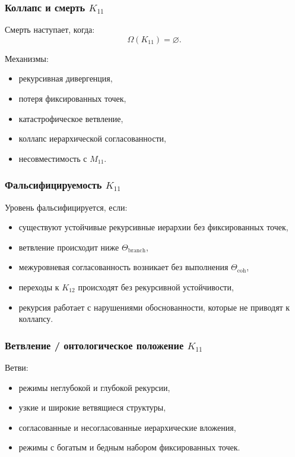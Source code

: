 \subsubsection{Коллапс и смерть $K_{11}$}

Смерть наступает, когда:
\[
\Omega(K_{11})=\varnothing.
\]

Механизмы:
\begin{itemize}
    \item рекурсивная дивергенция,
    \item потеря фиксированных точек,
    \item катастрофическое ветвление,
    \item коллапс иерархической согласованности,
    \item несовместимость с $M_{11}$.
\end{itemize}

\subsubsection{Фальсифицируемость $K_{11}$}

Уровень фальсифицируется, если:
\begin{itemize}
    \item существуют устойчивые рекурсивные иерархии без фиксированных точек,
    \item ветвление происходит ниже $\Theta_{\mathrm{branch}}$,
    \item межуровневая согласованность возникает без выполнения $\Theta_{\mathrm{coh}}$,
    \item переходы к $K_{12}$ происходят без рекурсивной устойчивости,
    \item рекурсия работает с нарушениями обоснованности, которые не приводят к коллапсу.
\end{itemize}

\subsubsection{Ветвление / онтологическое положение $K_{11}$}

Ветви:
\begin{itemize}
    \item режимы неглубокой и глубокой рекурсии,
    \item узкие и широкие ветвящиеся структуры,
    \item согласованные и несогласованные иерархические вложения,
    \item режимы с богатым и бедным набором фиксированных точек.
\end{itemize}

